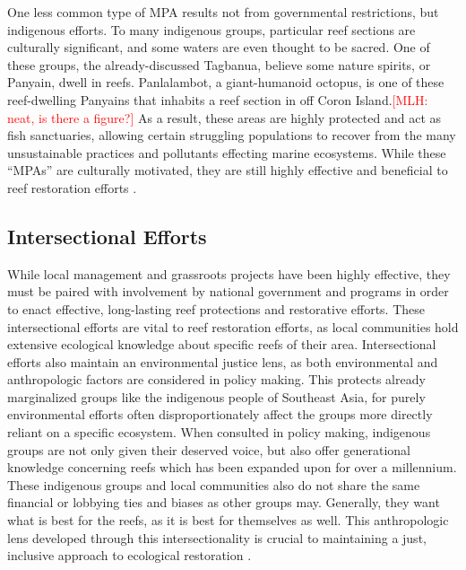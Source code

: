 \documentclass{book}\usepackage{knitr}
\newcommand{\red}[1]{\textcolor{red}{[MLH: #1]}}
\begin{document}
\begin{knitrout}
\begin{kframe}
{One less common type of MPA results not from governmental restrictions, but indigenous efforts. To many indigenous groups, particular reef sections are culturally significant, and some waters are even thought to be sacred. One of these groups, the already-discussed Tagbanua, believe some nature spirits, or Panyain, dwell in reefs. Panlalambot, a giant-humanoid octopus, is one of these reef-dwelling Panyains that inhabits a reef section in off Coron Island.\red{neat, is there a figure?} As a result, these areas are highly protected and act as fish sanctuaries, allowing certain struggling populations to recover from the many unsustainable practices and pollutants effecting marine ecosystems. While these ``MPAs'' are culturally motivated, they are still highly effective and beneficial to reef restoration efforts \citep{4826000120100501}.

\subsection{Intersectional Efforts} \label{sub:ie}

While local management and grassroots projects have been highly effective, they must be paired with involvement by national government and programs in order to enact effective, long-lasting reef protections and restorative efforts. These intersectional efforts are vital to reef restoration efforts, as local communities hold extensive ecological knowledge about specific reefs of their area. Intersectional efforts also maintain an environmental justice lens, as both environmental and anthropologic factors are considered in policy making. This protects already marginalized groups like the indigenous people of Southeast Asia, for purely environmental efforts often disproportionately affect the groups more directly reliant on a specific ecosystem. When consulted in policy making, indigenous groups are not only given their deserved voice, but also offer generational knowledge concerning reefs which has been expanded upon for over a millennium. These indigenous groups and local communities also do not share the same financial or lobbying ties and biases as other groups may. Generally, they want what is best for the reefs, as it is best for themselves as well. This anthropologic lens developed through this intersectionality is crucial to maintaining a just, inclusive approach to ecological restoration \citep{13772149520190801}.

}
\end{kframe}
\end{knitrout}
\end{document}
